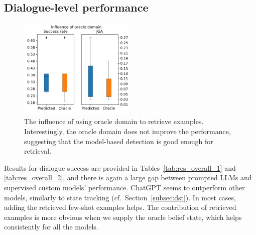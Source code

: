 \subsection{Dialogue-level performance}
\label{07:sec:dialogue-performance}
\begin{figure}[t]
    \centering
    \includegraphics[width=0.49\textwidth]{images/oracle_domains.png}
    \caption{The influence of using oracle domain to retrieve examples. Interestingly, the oracle domain does not improve the performance, suggesting that the model-based detection is good enough for retrieval.}
    \label{07:fig:oracle_domains}
\end{figure}
Results for dialogue success are provided in Tables~\ref{tab:res_overall_1} and \ref{tab:res_overall_2}, and there is again a large gap between prompted LLMs and supervised custom models' performance.
ChatGPT seems to outperform other models, similarly to state tracking (cf.~Section~\ref{subsec:dst}).
In most cases, adding the retrieved few-shot examples helps.
The contribution of retrieved examples is more obvious when we supply the oracle belief state, which helps consistently for all the models.

